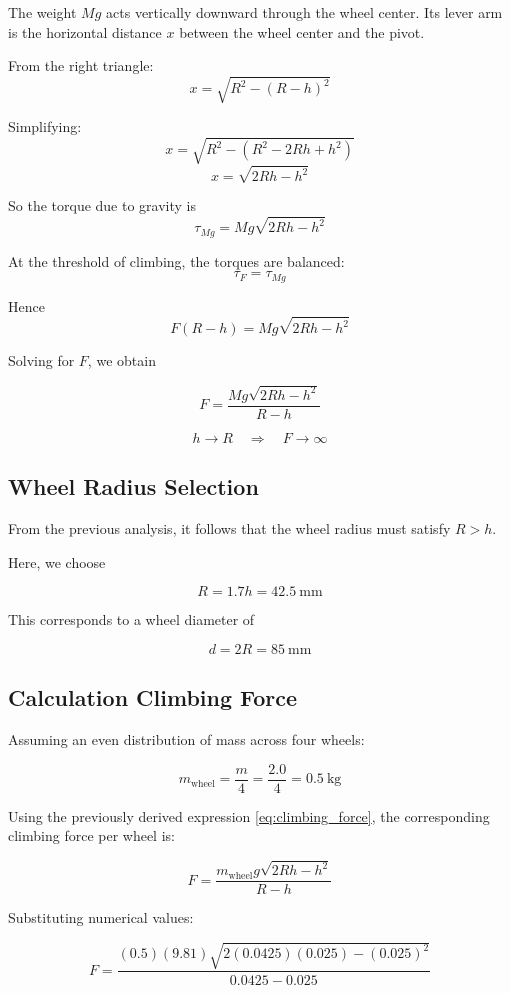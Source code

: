 \documentclass{article}
\begin{document}
The weight \(Mg\) acts vertically downward through the wheel center. Its lever arm is the horizontal distance \(x\) between the wheel center and the pivot.

From the right triangle:
\[
x = \sqrt{R^2 - (R-h)^2}
\]

Simplifying:
\[
x = \sqrt{R^2 - (R^2 - 2Rh + h^2)}
\]
\[
x = \sqrt{2Rh - h^2}
\]

So the torque due to gravity is
\[
\tau_{Mg} = Mg \sqrt{2Rh - h^2}
\]

At the threshold of climbing, the torques are balanced:
\[
\tau_F = \tau_{Mg}
\]

Hence
\[
F(R-h) = Mg \sqrt{2Rh - h^2}
\]

Solving for \(F\), we obtain

\begin{equation}
F = \frac{Mg \sqrt{2Rh - h^2}}{R - h}
\label{eq:climbing_force}
\end{equation}

\[
h \to R \quad \Rightarrow \quad F \to \infty
\]


\subsection{Wheel Radius Selection}

From the previous analysis, it follows that the wheel radius must satisfy $R>h$.

Here, we choose

\[
\boxed{R= 1.7h=42.5\ \text{mm}}
\]

This corresponds to a wheel diameter of

\[
\boxed{d = 2R = 85\ \text{mm}}
\]


\subsection{Calculation Climbing Force}

Assuming an even distribution of mass across four wheels:

\[
m_{\text{wheel}} = \frac{m}{4} = \frac{2.0}{4} = 0.5\ \text{kg}
\]

Using the previously derived expression \eqref{eq:climbing_force}, the corresponding climbing force per wheel is:

\[
F = \frac{m_{\text{wheel}}g\sqrt{2Rh - h^2}}{R - h}
\]

Substituting numerical values:

\[
F = \frac{(0.5)(9.81)\sqrt{2(0.0425)(0.025) - (0.025)^2}}{0.0425 - 0.025}
\]
\end{document}

